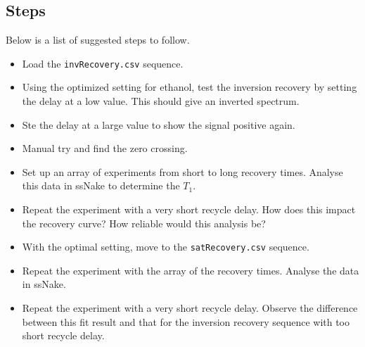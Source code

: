 \documentclass[11pt,a4paper]{article}
\begin{document}
\subsection{Steps}
Below is a list of suggested steps to follow.

\begin{itemize}
\item Load the \texttt{invRecovery.csv} sequence.
\item Using the optimized setting for ethanol, test the inversion recovery by setting the delay at a low value. This should give an inverted spectrum.
\item Ste the delay at a large value to show the signal positive again.
\item Manual try and find the zero crossing.
\item Set up an array of experiments from short to long recovery times. Analyse this data in ssNake to determine the $T_1$.
\item Repeat the experiment with a very short recycle delay. How does this impact the recovery curve? How reliable would this analysis be?
\item With the optimal setting, move to the \texttt{satRecovery.csv} sequence.
\item Repeat the experiment with the array of the recovery times. Analyse the data in ssNake.
\item Repeat the experiment with a very short recycle delay. Observe the difference between this fit result and that for the inversion recovery sequence with too short recycle delay.
\end{itemize}
\end{document}
